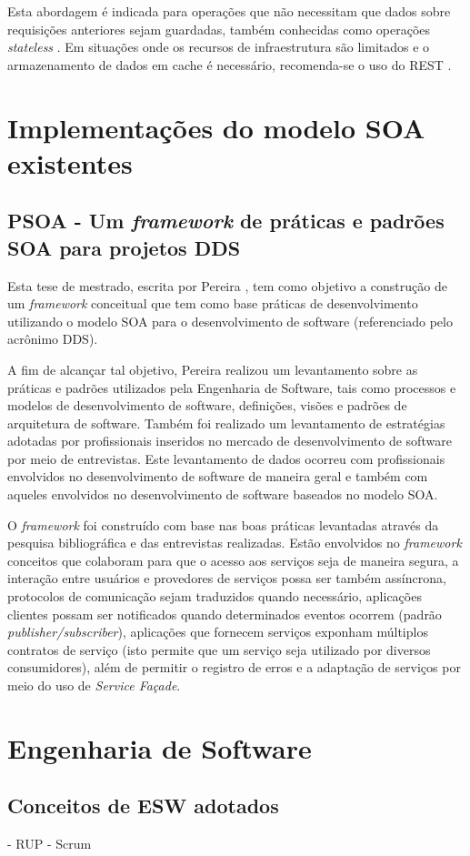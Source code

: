 Esta abordagem é indicada para operações que não necessitam que dados sobre requisições anteriores sejam guardadas, também conhecidas como operações \textit{stateless} \cite{rozlog_restesoap_2013}. Em situações onde os recursos de infraestrutura são limitados e o armazenamento de dados em cache é necessário, recomenda-se o uso do REST \cite{rozlog_restesoap_2013}.

\section{Implementações do modelo SOA existentes}

\subsection{PSOA - Um \textit{framework} de práticas e padrões SOA para projetos DDS}

Esta tese de mestrado, escrita por Pereira \cite{pereira_psoa_2011}, tem como objetivo a construção de um \textit{framework} conceitual que tem como base práticas de desenvolvimento utilizando o modelo SOA para o desenvolvimento de software (referenciado pelo acrônimo DDS).

A fim de alcançar tal objetivo, Pereira \cite{pereira_psoa_2011} realizou um levantamento sobre as práticas e padrões utilizados pela Engenharia de Software, tais como processos e modelos de desenvolvimento de software, definições, visões e padrões de arquitetura de software. Também foi realizado um levantamento de estratégias adotadas por profissionais inseridos no mercado de desenvolvimento de software por meio de entrevistas. Este levantamento de dados ocorreu com profissionais envolvidos no desenvolvimento de software de maneira geral e também com aqueles envolvidos no desenvolvimento de software baseados no modelo SOA.

O \textit{framework} foi construído com base nas boas práticas levantadas através da pesquisa bibliográfica e das entrevistas realizadas. Estão envolvidos no \textit{framework} conceitos que colaboram para que o acesso aos serviços seja de maneira segura, a interação entre usuários e provedores de serviços possa ser também assíncrona, protocolos de comunicação sejam traduzidos quando necessário, aplicações clientes possam ser notificados quando determinados eventos ocorrem (padrão \textit{publisher/subscriber}), aplicações que fornecem serviços exponham múltiplos contratos de serviço (isto permite que um serviço seja utilizado por diversos consumidores), além de permitir o registro de erros e a adaptação de serviços por meio do uso de \textit{Service Façade}.



\section{Engenharia de Software}

\subsection{Conceitos de ESW adotados}
- RUP
- Scrum